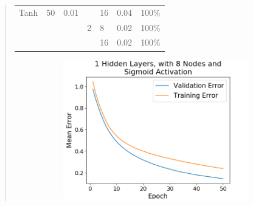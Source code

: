\documentclass{article}
\begin{document}
\begin{quote}
\begin{table}[h]
\begin{tabular}{|c|c|c|c|l|c|c|}
			Tanh                                                          & 50                    & 0.01                                                    &                                                         & 16                                                                             & 0.04                                                      & 100\%                                                   \\ \cline{4-7} 
			&                       &                                                         & 2                                                       & 8                                                                              & 0.02                                                      & 100\%                                                   \\ \cline{5-7} 
			\multicolumn{1}{|l|}{}                                        & \multicolumn{1}{l|}{} & \multicolumn{1}{l|}{}                                   & \multicolumn{1}{l|}{}                                   & 16                                                                             & 0.02                                                      & 100\%                                                   \\ \hline
		\end{tabular}
	\end{table}
\begin{figure}[h]
	\centering
	\begin{subfigure}[h]{0.23\textwidth}
		\includegraphics[width=\textwidth]{figs/Iris_Multiclass_Classification_1_Hidden_Layers_with_8_Nodes_and_Sigmoid_Activation.png}

\end{subfigure}
\end{figure}
\end{quote}
\end{document}

